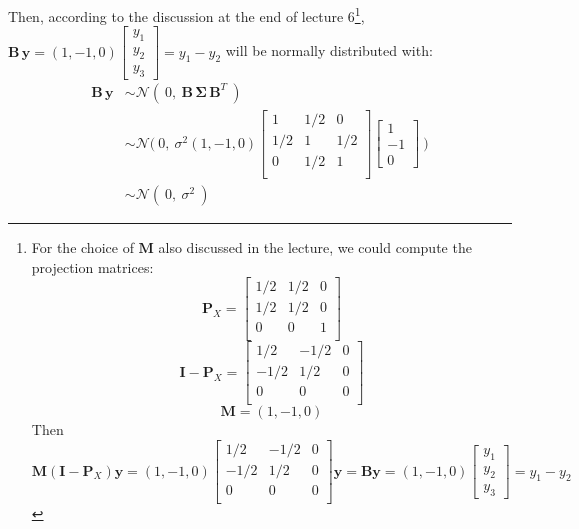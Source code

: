 \documentclass[paper=a4, fontsize=11pt]{scrartcl} %
\newcommand{\matSigma}{\mathbf{\Sigma}}
\newcommand{\vecY}{\mathbf{y}}
\newcommand{\matB}{\mathbf{B}}
\newcommand{\matI}{\mathbf{I}}
\newcommand{\matM}{\mathbf{M}}
\newcommand{\matP}{\mathbf{P}}
\begin{document}
Then, according to the discussion at the end of lecture 6\footnote{
For the choice of $\matM$ also discussed in the lecture, we could compute the projection matrices:
$$
\matP_X = 
\begin{bmatrix} 1/2 & 1/2 & 0\\
			     1/2 & 1/2 & 0\\
		 	     0 & 0 & 1\\
\end{bmatrix}
$$
$$
\matI - \matP_X = 
\begin{bmatrix} 1/2 & -1/2 & 0\\
			     -1/2 & 1/2 & 0\\
		 	     0 & 0 & 0\\
\end{bmatrix}
$$
$$
\matM = (1, -1, 0)
$$
Then
$$
\matM (\matI - \matP_X) \vecY =
 (1, -1, 0)
 \begin{bmatrix} 1/2 & -1/2 & 0\\
			     -1/2 & 1/2 & 0\\
		 	     0 & 0 & 0\\
\end{bmatrix}
\vecY
= 
\matB \vecY =
 (1, -1, 0) 
 \begin{bmatrix} y_1\\
			     y_2\\
		 	     y_3 
\end{bmatrix}
 = y_1 - y_2
$$

}, 
$\matB \, \vecY =  (1, -1, 0)
\begin{bmatrix} y_1\\
			     y_2\\
		 	     y_3 
\end{bmatrix} =
y_1 - y_2 $ will be normally distributed with:
\begin{align*}
\matB \, \vecY   &\sim \mathcal{N}(\ 0, \ \matB \, \matSigma \, \matB^T \ )\\
 &\sim \mathcal{N}\Big(\ 0,  \ \sigma^2 
 (1, -1, 0)
\begin{bmatrix} 1 & 1/2 & 0\\
			     1/2 & 1 & 1/2\\
		 	     0 & 1/2 & 1\\
\end{bmatrix}
\begin{bmatrix} 1\\
			     -1\\
		 	     0 
\end{bmatrix} \ \Big)\\
 &\sim \mathcal{N} (\ 0, \ \sigma^2 \ )
\end{align*}
\end{document}
